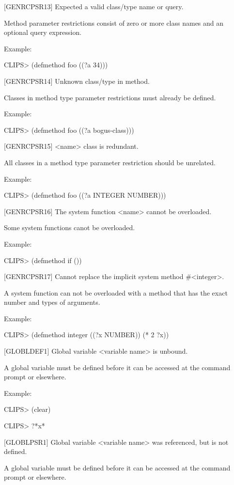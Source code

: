 \documentclass[letterpaper,10pt,english]{sphinxmanual}
\begin{document}
{[}GENRCPSR13{]} Expected a valid class/type name or query.

Method parameter restrictions consist of zero or more class names and an
optional query expression.

Example:

CLIPS\textgreater{} (defmethod foo ((?a 34)))

{[}GENRCPSR14{]} Unknown class/type in method.

Classes in method type parameter restrictions must already be defined.

Example:

CLIPS\textgreater{} (defmethod foo ((?a bogus-class)))

{[}GENRCPSR15{]} \textless{}name\textgreater{} class is redundant.

All classes in a method type parameter restriction should be unrelated.

Example:

CLIPS\textgreater{} (defmethod foo ((?a INTEGER NUMBER)))

{[}GENRCPSR16{]} The system function \textless{}name\textgreater{} cannot be overloaded.

Some system functions canot be overloaded.

Example:

CLIPS\textgreater{} (defmethod if ())

{[}GENRCPSR17{]} Cannot replace the implicit system method \#\textless{}integer\textgreater{}.

A system function can not be overloaded with a method that has the exact
number and types of arguments.

Example:

CLIPS\textgreater{} (defmethod integer ((?x NUMBER)) (* 2 ?x))

{[}GLOBLDEF1{]} Global variable \textless{}variable name\textgreater{} is unbound.

A global variable must be defined before it can be accessed at the
command prompt or elsewhere.

Example:

CLIPS\textgreater{} (clear)

CLIPS\textgreater{} ?*x*

{[}GLOBLPSR1{]} Global variable \textless{}variable name\textgreater{} was referenced, but is not
defined.

A global variable must be defined before it can be accessed at the
command prompt or elsewhere.
\end{document}

